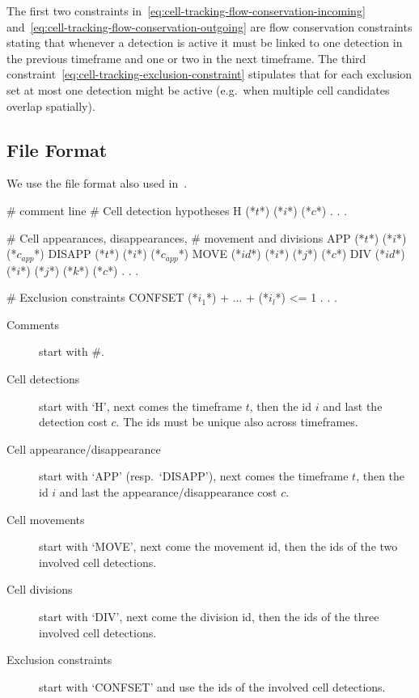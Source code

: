 The first two constraints in~\eqref{eq:cell-tracking-flow-conservation-incoming} and~\eqref{eq:cell-tracking-flow-conservation-outgoing} are flow conservation constraints stating that whenever a detection is active it must be linked to one detection in the previous timeframe and one or two in the next timeframe.
The third constraint~\eqref{eq:cell-tracking-exclusion-constraint} stipulates that for each exclusion set at most one detection might be active (e.g.\ when multiple cell candidates overlap spatially).

\subsection{File Format}
We use the file format also used in~\cite{haller2020primal}.

\begin{fileformat}
# comment line
# Cell detection hypotheses
H (*$t$*) (*$i$*) (*$c$*)
.
.
.

# Cell appearances, disappearances,
# movement and divisions
APP (*$t$*) (*$i$*) (*$c_{app}$*)
DISAPP (*$t$*) (*$i$*) (*$c_{app}$*)
MOVE (*$id$*) (*$i$*) (*$j$*) (*$c$*)
DIV (*$id$*) (*$i$*) (*$j$*) (*$k$*) (*$c$*)
.
.
.

# Exclusion constraints
CONFSET (*$i_1$*) + ... + (*$i_l$*) <= 1
.
.
.
\end{fileformat}

\begin{description}
    \item[\normalfont Comments] start with \#.
    \item[\normalfont Cell detections] start with `H', next comes the timeframe $t$, then the id $i$ and last the detection cost $c$. The ids must be unique also across timeframes.
    \item[\normalfont Cell appearance/disappearance] start with `APP' (resp.\ `DISAPP'), next comes the timeframe $t$, then the id $i$ and last the appearance/disappearance cost $c$.
    \item[\normalfont Cell movements] start with `MOVE', next come the movement id, then the ids of the two involved cell detections.
    \item[\normalfont Cell divisions] start with `DIV', next come the division id, then the ids of the three involved cell detections.
    \item[\normalfont Exclusion constraints] start with `CONFSET' and use the ids of the involved cell detections.
\end{description}

